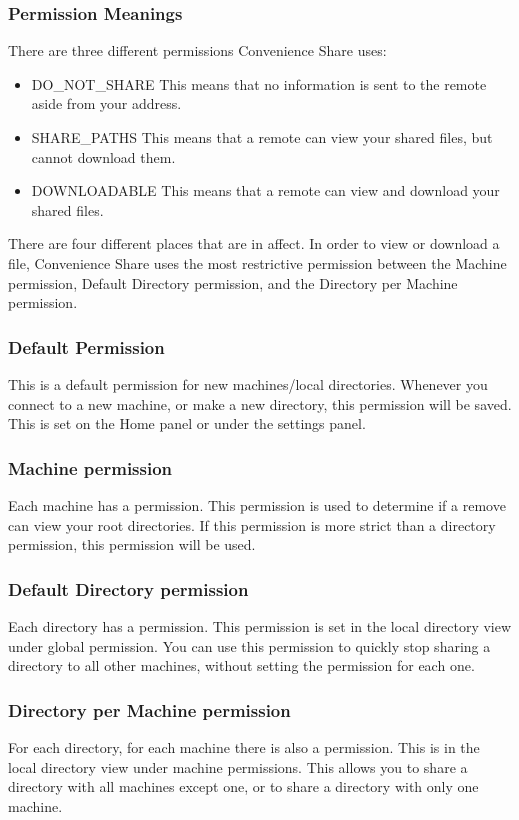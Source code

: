 \documentclass{article}
\begin{document}
\subsubsection{Permission Meanings}
There are three different permissions Convenience Share uses:

\begin{itemize}
  \item DO\_NOT\_SHARE   This means that no information is sent to the remote aside from your address.
  \item SHARE\_PATHS     This means that a remote can view your shared files, but cannot download them.
  \item DOWNLOADABLE     This means that a remote can view and download your shared files.
\end{itemize}

There are four different places that are in affect.
In order to view or download a file, Convenience Share uses the most restrictive permission between the Machine permission, Default Directory permission, and the Directory per Machine permission.

\subsubsection{Default Permission}
This is a default permission for new machines/local directories.
Whenever you connect to a new machine, or make a new directory, this permission will be saved.
This is set on the Home panel or under the settings panel.

\subsubsection{Machine permission}
Each machine has a permission.
This permission is used to determine if a remove can view your root directories.
If this permission is more strict than a directory permission, this permission will be used.

\subsubsection{Default Directory permission}
Each directory has a permission.
This permission is set in the local directory view under global permission.
You can use this permission to quickly stop sharing a directory to all other machines, without setting the permission for each one.

\subsubsection{Directory per Machine permission}
For each directory, for each machine there is also a permission.
This is in the local directory view under machine permissions.
This allows you to share a directory with all machines except one, or to share a directory with only one machine.
\end{document}
